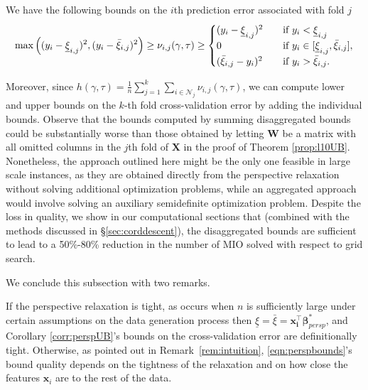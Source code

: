 \documentclass[ijoc,noblindrev]{informs3} %
\newcommand{\ag}[1]{{\color{black}#1}}
\begin{document}
\begin{corollary}\label{corr:perspUB}
	We have the following bounds on the $i$th prediction error \ag{associated with fold $j$}
	\begin{align}\label{eqn:perspbounds}
		\max\left((y_i-\underline{\xi}_{i,j})^2, (y_i-\bar{\xi}_{i,j})^2\right) \geq \ag{\nu_{i,j}(\gamma, \tau)} \geq \begin{cases} (y_i-\underline{\xi}_{i,j})^2 \quad & \text{if} \ y_i < \underline{\xi}_{i,j}\\
			0 \quad & \text{if} \ y_i \in [\underline{\xi}_{i,j}, \bar{\xi}_{i,j}],\\
			(\bar{\xi}_{i,j}-y_i)^2 \quad & \text{if} \ y_i > \bar{\xi}_{i,j}.
		\end{cases}
	\end{align}
\end{corollary}
Moreover, since $h(\gamma,\tau)=\frac{1}{n}\sum_{j=1}^k\sum_{i\in \mathcal{N}_j}\nu_{i,j}(\gamma,\tau)$, we can compute lower and upper bounds on the $k$-th fold cross-validation error \ag{by adding the individual bounds. Observe that the bounds computed by summing disaggregated bounds could be substantially worse than those obtained by letting $\bm{W}$ be a matrix with all omitted columns in the $j$th fold of $\bm{X}$ in the proof of Theorem \ref{prop:l10UB}. Nonetheless, the approach outlined here might be the only one feasible in large scale instances, as they are obtained directly from the perspective relaxation without solving additional optimization problems, while an aggregated approach would involve solving an auxiliary semidefinite optimization problem. Despite the loss in quality, we show in our computational sections that (combined with the methods discussed in \S\ref{sec:corddescent}), the disaggregated bounds are sufficient to lead to a 50\%-80\% reduction in the number of MIO solved with respect to grid search.}

We conclude this subsection with two remarks.

\begin{remark}
	If the perspective relaxation is tight, as occurs 
 when $n$ is sufficiently large under certain assumptions on the data generation process \citep{pilanci2015sparse, reeves2019all}
 then 	$\underline{\xi}=\bar{\xi}=\bm{x_i^\top}\bm{\beta}_{persp}^*$, and Corollary \ref{corr:perspUB}'s bounds on the cross-validation error are definitionally tight. Otherwise, as pointed out in Remark~\ref{rem:intuition}, \eqref{eqn:perspbounds}'s bound quality depends on the tightness of the relaxation and on how close the features $\bm{x}_i$ are to the rest of the data. 
\end{remark}
\end{document}

